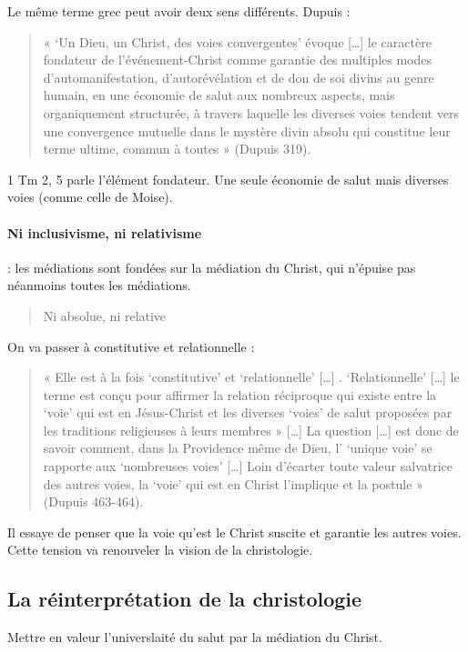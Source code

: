 Le même terme grec peut avoir deux sens différents.
Dupuis : 
\begin{quote}
    « ‘Un Dieu, un Christ, des voies convergentes’ évoque […] le caractère fondateur de l’événement-Christ comme garantie des multiples modes d’automanifestation, d’autorévélation et de don de soi divins au genre humain, en une économie de salut aux nombreux aspects, mais organiquement structurée, à travers laquelle les diverses voies tendent vers une convergence mutuelle dans le mystère divin absolu qui constitue leur terme ultime, commun à toutes » (Dupuis 319).

\end{quote}

1 Tm 2, 5 parle l’élément fondateur. Une seule économie de salut mais diverses voies (comme celle de Moise). 
\paragraph{Ni inclusivisme, ni relativisme} : les médiations sont fondées sur la médiation du Christ, qui n’épuise pas néanmoins toutes les médiations. 
\begin{quote}
    Ni absolue, ni relative
\end{quote}

On va passer à constitutive et relationnelle : 
\begin{quote}
    « Elle est à la fois ‘constitutive’ et ‘relationnelle’ […] . ‘Relationnelle’ […] le terme est conçu pour affirmer la relation réciproque qui existe entre la ‘voie’ qui est en Jésus-Christ et les diverses ‘voies’ de salut proposées par les traditions religieuses à leurs membres » […] La question […] est donc de savoir comment, dans la Providence même de Dieu, l’ ‘unique voie’ se rapporte aux ‘nombreuses voies’ […] Loin d’écarter toute valeur salvatrice des autres voies, la ‘voie’ qui est en Christ l’implique et la postule » (Dupuis 463-464).
\end{quote}


Il essaye de penser que la voie qu’est le Christ suscite et garantie les autres voies. Cette tension va renouveler la vision de la christologie.


 
\subsection{La réinterprétation de la christologie}  
Mettre en valeur l’universlaité du salut par la médiation du Christ.
